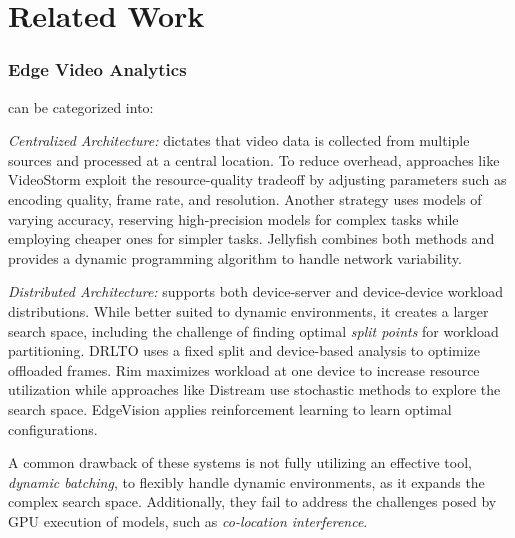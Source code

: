 \section{Related Work}
\label{sec:related-work}

\subsubsection{\textbf{Edge Video Analytics}} can be categorized into:
\hfill

\textit{Centralized Architecture: } dictates that video data is collected from multiple sources and processed at a central location.
To reduce overhead, approaches like VideoStorm \cite{zhang2017videostorm, Jiang2018chameleon, Tan2020FastVA, Zhang2018awstream, Li2020reducto} exploit the resource-quality tradeoff by adjusting parameters such as encoding quality, frame rate, and resolution.
Another strategy \cite{Kang2017noscope,Zhang2015vigil} uses models of varying accuracy, reserving high-precision models for complex tasks while employing cheaper ones for simpler tasks.
Jellyfish \cite{nigade2022jellyfish} combines both methods and provides a dynamic programming algorithm to handle network variability.

\textit{Distributed Architecture: } supports both device-server and device-device workload distributions.
While better suited to dynamic environments, it creates a larger search space, including the challenge of finding optimal \textit{split points} for workload partitioning.
DRLTO \cite{wang2022DRLTO} uses a fixed split and device-based analysis to optimize offloaded frames.
Rim \cite{hu2021rim} maximizes workload at one device to increase resource utilization while approaches like Distream \cite{Hung2018VideoEdge, liang2024splitstream, zeng2020distream} use stochastic methods to explore the search space.
EdgeVision \cite{gao2024edgevision} applies reinforcement learning to learn optimal configurations.

A common drawback of these systems is not fully utilizing an effective tool, \textit{dynamic batching}, to flexibly handle dynamic environments, as it expands the complex search space. Additionally, they fail to address the challenges posed by GPU execution of models, such as \textit{co-location interference}.

